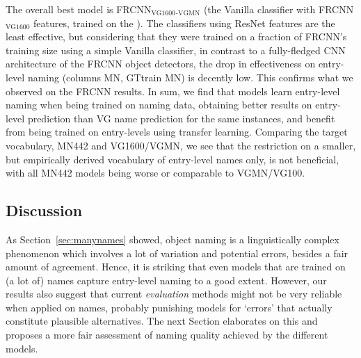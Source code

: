  The overall best model is FRCNN$_\text{VG1600}$$_\text{-VGMN}$ (the Vanilla classifier with FRCNN$_\text{VG1600}$ features, trained on the \mn). 
The classifiers using ResNet features are the least effective, but considering that they were trained on a fraction of FRCNN's training size using a simple Vanilla classifier, in contrast to a fully-fledged CNN architecture of the FRCNN object detectors, the drop in effectiveness on entry-level naming (columns MN, GTtrain MN) is decently low. This confirms what we observed on the FRCNN results. 
In sum, we find that models learn entry-level naming when being trained on \arbitrary naming data, obtaining better results on entry-level prediction than VG name prediction for the same instances, and benefit from being trained on entry-levels using transfer learning. Comparing the target vocabulary, MN442 and VG1600/VGMN, we see that the restriction on a smaller, but empirically derived vocabulary of entry-level names only, is not beneficial, with all MN442 models being worse or comparable to VGMN/VG100.


\subsection{Discussion}
\label{sect:exp_discussion}

As Section~\ref{sec:manynames} showed, object naming is a linguistically complex phenomenon which involves a lot of variation and potential errors, besides a fair amount of agreement.
Hence, it is striking that even models that are trained on (a lot of) \arbitrary names capture entry-level naming to a good extent.
However, our results also suggest that current \textit{evaluation} methods might not be very reliable when applied on \arbitrary names, probably punishing models for `errors' that actually constitute plausible alternatives.
The next Section elaborates on this and proposes a more fair assessment of naming quality achieved by the different models.

